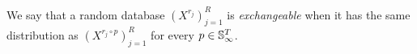 
\begin{definition}
We say that a random database $(X^{r_j})_{j=1}^R$ is \emph{exchangeable} when it has the same distribution as $(X^{r_j\circ p})_{j=1}^R$ for every $p \in \mathbb{S}_{\infty}^T$.
\end{definition}








